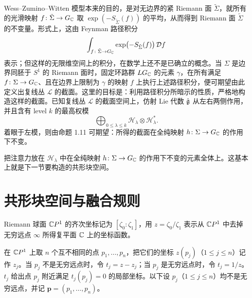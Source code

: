 
Wess--Zumino--Witten 模型本来的目的，是对无边界的紧 Riemann 面 $\tilde\Sigma$，就所有的光滑映射 $f\colon\tilde\Sigma\to G_{\mathbb{C}}$ 取 $\exp(-S_{\tilde\Sigma}(f))$ 的平均，从而得到 Riemann 面 $\tilde\Sigma$ 的不变量。形式上，这由 Feynman 路径积分
\[
  \int_{f\colon\tilde\Sigma\to G_{\mathbb{C}}}\exp\bigl(-S_{\tilde\Sigma}(f)\bigr)\,\mathcal{D}f
\]
表示；但这样的无限维空间上的积分，在数学上还不是已确立的概念。当 $\Sigma$ 是边界同胚于 $S^{1}$ 的 Riemann 面时，固定环路群 $LG_{\mathbb{C}}$ 的元素 $\gamma$，在所有满足 $f\colon\Sigma\to G_{\mathbb{C}}$、且在边界上限制为 $\gamma$ 的映射 $f$ 上执行上述路径积分，便可期望由此定义出复线丛 $\mathcal{L}$ 的截面。这里的目标是：利用路径积分所暗示的性质，严格地构造这样的截面。已知复线丛 $\mathcal{L}$ 的截面空间上，仿射 Lie 代数 $\hat{\mathfrak{g}}$ 从左右两侧作用，并且含有 level $k$ 的最高权模
\[
  \bigoplus_{0\le\lambda\le k}\mathcal{H}_{\lambda}\otimes\mathcal{H}_{\lambda}^{*} .
\]
着眼于左模，则由命题 1.11 可期望：所得的截面在全纯映射 $h\colon\Sigma\to G_{\mathbb{C}}$ 的作用下不变。

把注意力放在 $\mathcal{H}_{\lambda}$ 中在全纯映射 $h\colon\Sigma\to G_{\mathbb{C}}$ 的作用下不变的元素全体上。这基本上就是下一节要构造的共形块空间。

\section{共形块空间与融合规则}


Riemann 球面 $\mathbb{C}P^1$ 的齐次坐标记为 $[\zeta_0:\zeta_1]$，用 $z=\zeta_0/\zeta_1$ 表示从 $\mathbb{C}P^1$ 中去掉无穷远点 $\infty$ 所得复平面 $\mathbb{C}$ 上的坐标函数。

在 $\mathbb{C}P^1$ 上取 $n$ 个互不相同的点 $p_1,\dots,p_n$，把它们的坐标 $z(p_j)$（$1\le j\le n$）记作 $z_j$。当 $p_j$ 不是无穷远点时，令 $t_j=z-z_j$；当 $p_j$ 是无穷远点时，令 $t_j=1/z$。$t_j$ 给出点 $p_j$ 附近满足 $t_j(p_j)=0$ 的局部坐标。以下设 $p_j$（$1\le j\le n$）均不是无穷远点，并记 $\bm p=(p_1,\dots,p_n)$。

